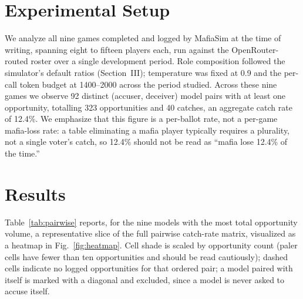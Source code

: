 \documentclass[10pt,conference]{IEEEtran}
\begin{document}
\section{Experimental Setup}

We analyze all nine games completed and logged by MafiaSim at the time of writing, spanning eight to fifteen players each, run against the OpenRouter-routed roster over a single development period. Role composition followed the simulator's default ratios (Section~III); temperature was fixed at 0.9 and the per-call token budget at 1400--2000 across the period studied. Across these nine games we observe 92 distinct (accuser, deceiver) model pairs with at least one opportunity, totalling 323 opportunities and 40 catches, an aggregate catch rate of 12.4\%. We emphasize that this figure is a per-ballot rate, not a per-game mafia-loss rate: a table eliminating a mafia player typically requires a plurality, not a single voter's catch, so 12.4\% should not be read as ``mafia lose 12.4\% of the time.''

\section{Results}

Table~\ref{tab:pairwise} reports, for the nine models with the most total opportunity volume, a representative slice of the full pairwise catch-rate matrix, visualized as a heatmap in Fig.~\ref{fig:heatmap}. Cell shade is scaled by opportunity count (paler cells have fewer than ten opportunities and should be read cautiously); dashed cells indicate no logged opportunities for that ordered pair; a model paired with itself is marked with a diagonal and excluded, since a model is never asked to accuse itself.
\end{document}
